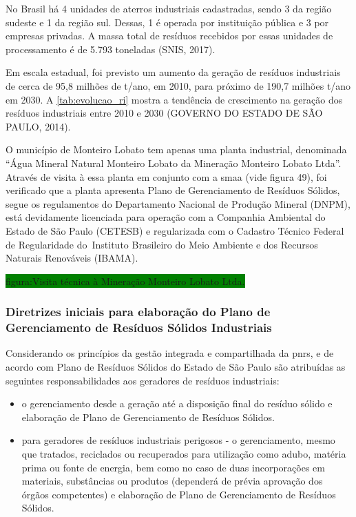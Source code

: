 	No Brasil há 4 unidades de aterros industriais cadastradas, sendo 3 da região sudeste e 1 da região sul. Dessas, 1 é operada por instituição pública e 3 por empresas privadas. A massa total de resíduos recebidos por essas unidades de processamento é de 5.793 toneladas (SNIS, 2017).
	
	Em escala estadual, foi previsto um aumento da geração de resíduos industriais de cerca de 95,8 milhões de t/ano, em 2010, para próximo de 190,7 milhões t/ano em 2030. A \autoref{tab:evolucao_ri} mostra a tendência de crescimento na geração dos resíduos industriais entre 2010 e 2030 (GOVERNO DO ESTADO DE SÃO PAULO, 2014).
	
	
	
	O município de Monteiro Lobato tem apenas uma planta industrial, denominada “Água Mineral Natural Monteiro Lobato da Mineração Monteiro Lobato Ltda”. Através de visita à essa planta em conjunto com a \gls{smaa} (vide figura 49), foi verificado que a planta apresenta Plano de Gerenciamento de Resíduos Sólidos, segue os regulamentos do Departamento Nacional de Produção Mineral (DNPM), está devidamente licenciada para operação com a Companhia Ambiental do Estado de São Paulo (CETESB) e regularizada com o Cadastro Técnico Federal de Regularidade do Instituto Brasileiro do Meio Ambiente e dos Recursos Naturais Renováveis (IBAMA).
	
	\colorbox{green}{figura:Visita técnica à Mineração Monteiro Lobato Ltda.}
	
	\subsubsection{Diretrizes iniciais para elaboração do Plano de Gerenciamento de Resíduos Sólidos Industriais}
	
	Considerando os princípios da gestão integrada e compartilhada da \gls{pnrs}, e de acordo com Plano de Resíduos Sólidos do Estado de São Paulo são atribuídas as seguintes responsabilidades aos geradores de resíduos industriais:
	
	\begin{itemize}
		\item o gerenciamento desde a geração até a disposição final do resíduo sólido e elaboração de Plano de Gerenciamento de Resíduos Sólidos.
		\item para geradores de resíduos industriais perigosos - o gerenciamento, mesmo que tratados, reciclados ou recuperados para utilização como adubo, matéria prima ou fonte de energia, bem como no caso de duas incorporações em materiais, substâncias ou produtos (dependerá de prévia aprovação dos órgãos competentes) e elaboração de Plano de Gerenciamento de Resíduos Sólidos.
	\end{itemize}

